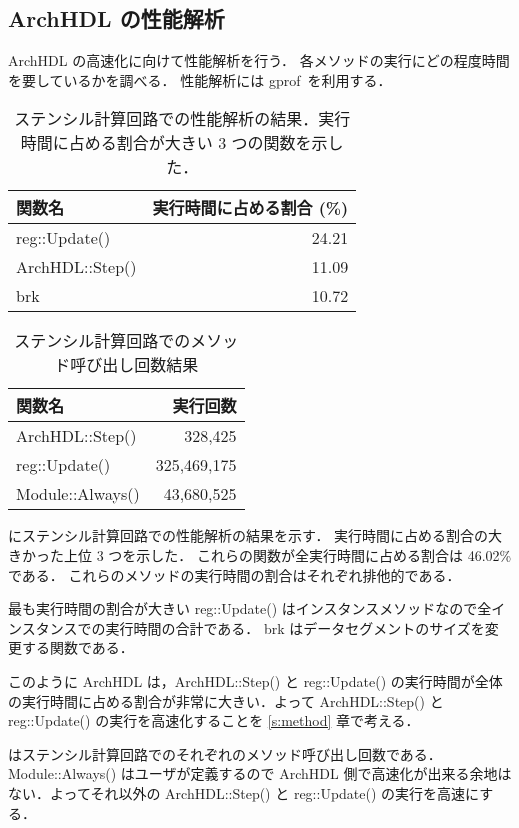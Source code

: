 

\subsection{ArchHDL の性能解析 \label{ss:profiling}}

ArchHDL の高速化に向けて性能解析を行う．
各メソッドの実行にどの程度時間を要しているかを調べる．
性能解析には gprof~\cite{gprof}を利用する．

\begin{table}[t]
 \caption{ステンシル計算回路での性能解析の結果．実行時間に占める割合が大きい 3 つの関数を示した．}
 \label{table:stencil_prof}
 \begin{center}
  \begin{tabular}{l|r} \hline
  関数名 & 実行時間に占める割合 (\%) \\ \hline
  reg::Update() & 24.21 \\
  ArchHDL::Step() & 11.09 \\
  brk & 10.72 \\ \hline
  \end{tabular}
 \end{center}
\end{table}

\begin{table}[t]
 \caption{ステンシル計算回路でのメソッド呼び出し回数結果}
 \label{table:stencil_method_call_count}
 \begin{center}
  \begin{tabular}{l|r} \hline
  関数名 & 実行回数 \\ \hline
  ArchHDL::Step()   &     328,425 \\
  reg::Update()     & 325,469,175 \\
  Module::Always()  &  43,680,525 \\ \hline
  \end{tabular}
 \end{center}
\end{table}

 にステンシル計算回路での性能解析の結果を示す．
実行時間に占める割合の大きかった上位 3 つを示した．
これらの関数が全実行時間に占める割合は 46.02\% である．
これらのメソッドの実行時間の割合はそれぞれ排他的である．

最も実行時間の割合が大きい reg::Update() はインスタンスメソッドなので全インスタンスでの実行時間の合計である．
brk はデータセグメントのサイズを変更する関数である．

このように ArchHDL は，ArchHDL::Step() と reg::Update()
の実行時間が全体の実行時間に占める割合が非常に大きい．よって
ArchHDL::Step() と reg::Update() の実行を高速化することを \ref{s:method}
章で考える．

はステンシル計算回路でのそれぞれのメソッド呼び出し回数である．Module::Always()
はユーザが定義するので ArchHDL
側で高速化が出来る余地はない．よってそれ以外の ArchHDL::Step() と
reg::Update() の実行を高速にする．
